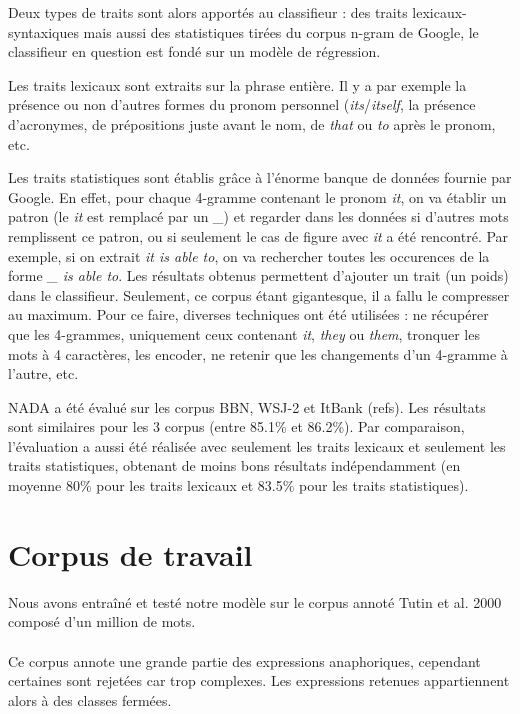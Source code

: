 \documentclass[a4paper,12pt]{article}
\begin{document}
Deux types de traits sont alors apportés au classifieur : des traits lexicaux-syntaxiques mais aussi des statistiques tirées du corpus n-gram de Google\cite{google-ngram}, le classifieur en question est fondé sur un modèle de régression.

Les traits lexicaux sont extraits sur la phrase entière. Il y a par exemple la présence ou non d'autres formes du pronom personnel (\textit{its}/\textit{itself}, la présence d'acronymes, de prépositions juste avant le nom, de \og{}\textit{that}\fg{} ou \og{}\textit{to}\fg{} après le pronom, etc.

Les traits statistiques sont établis grâce à l'énorme banque de données fournie par Google. En effet, pour chaque 4-gramme contenant le pronom \og{}\textit{it}\fg{}, on va établir un patron (le \og{}\textit{it}\fg{} est remplacé par un \og{}\textit{\_}\fg{}) et regarder dans les données si d'autres mots remplissent ce patron, ou si seulement le cas de figure avec \og{}\textit{it}\fg{} a été rencontré. Par exemple, si on extrait \og{}\textit{it is able to}\fg{}, on va rechercher toutes les occurences de la forme \og{}\textit{\_ is able to}\fg{}.
Les résultats obtenus permettent d'ajouter un trait (un poids) dans le classifieur.
Seulement, ce corpus étant gigantesque, il a fallu le compresser au maximum. Pour ce faire, diverses techniques ont été utilisées : ne récupérer que les 4-grammes, uniquement ceux contenant \og{}\textit{it}\fg{}, \og{}\textit{they}\fg{} ou \og{}\textit{them}\fg{}, tronquer les mots à 4 caractères, les encoder, ne retenir que les changements d'un 4-gramme à l'autre, etc.

NADA a été évalué sur les corpus BBN, WSJ-2 et ItBank (refs). Les résultats sont similaires pour les 3 corpus (entre 85.1\% et 86.2\%). Par comparaison, l'évaluation a aussi été réalisée avec seulement les traits lexicaux et seulement les traits statistiques, obtenant de moins bons résultats indépendamment (en moyenne 80\% pour les traits lexicaux et 83.5\% pour les traits statistiques).

\section{Corpus de travail}

Nous avons entraîné et testé notre modèle sur le corpus annoté Tutin et al. 2000 composé d'un million de mots.

\paragraph{}
Ce corpus annote une grande partie des expressions anaphoriques, cependant certaines sont rejetées car trop complexes. Les expressions retenues appartiennent alors à des classes fermées.
\end{document}
